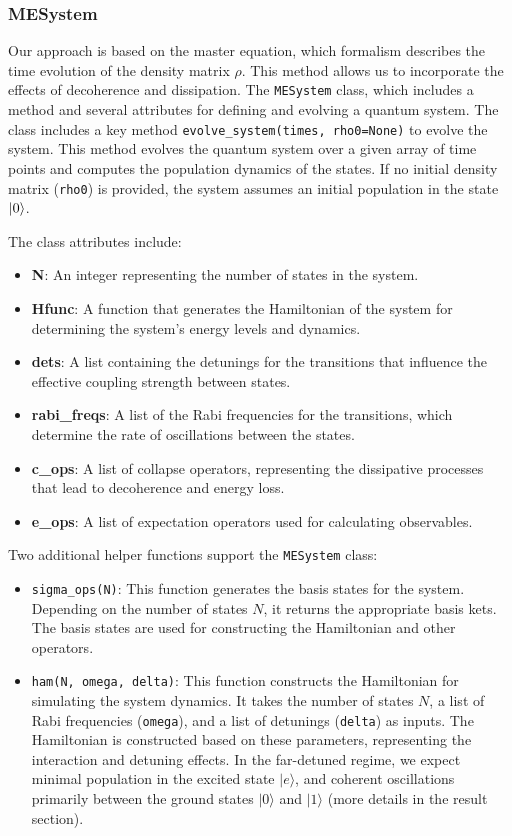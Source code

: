 \documentclass{article}
\begin{document}
\subsubsection{MESystem}
Our approach is based on the master equation, which formalism describes the time evolution of the density matrix \(\rho\). This method allows us to incorporate the effects of decoherence and dissipation. The \texttt{MESystem} class, which includes a method and several attributes for defining and evolving a quantum system.
The class includes a key method \texttt{evolve\_system(times, rho0=None)} to evolve the system. This method evolves the quantum system over a given array of time points and computes the population dynamics of the states. If no initial density matrix (\texttt{rho0}) is provided, the system assumes an initial population in the state \(\ket{0}\).

The class attributes include:

\begin{itemize}
    \item \textbf{N}: An integer representing the number of states in the system.
    \item \textbf{Hfunc}: A function that generates the Hamiltonian of the system for determining the system's energy levels and dynamics.
    \item \textbf{dets}: A list containing the detunings for the transitions that influence the effective coupling strength between states.
    \item \textbf{rabi\_freqs}: A list of the Rabi frequencies for the transitions, which determine the rate of oscillations between the states.
    \item \textbf{c\_ops}: A list of collapse operators, representing the dissipative processes that lead to decoherence and energy loss. 
    \item \textbf{e\_ops}: A list of expectation operators used for calculating observables.
\end{itemize}


Two additional helper functions support the \texttt{MESystem} class:
\begin{itemize}
    \item \texttt{sigma\_ops(N)}: This function generates the basis states for the system. Depending on the number of states \(N\), it returns the appropriate basis kets. The basis states are used for constructing the Hamiltonian and other operators.
    \item \texttt{ham(N, omega, delta)}: This function constructs the Hamiltonian for simulating the system dynamics. It takes the number of states \(N\), a list of Rabi frequencies (\texttt{omega}), and a list of detunings (\texttt{delta}) as inputs. The Hamiltonian is constructed based on these parameters, representing the interaction and detuning effects. In the far-detuned regime, we expect minimal population in the excited state \(|e\rangle\), and coherent oscillations primarily between the ground states \(|0\rangle\) and \(|1\rangle\) (more details in the result section).
\end{itemize}
\end{document}
